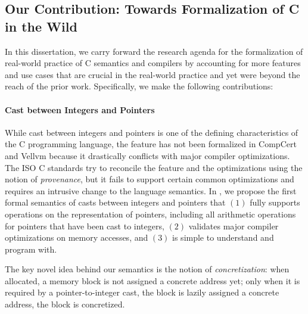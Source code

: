 



\subsection{Our Contribution: Towards Formalization of C in the Wild}

In this dissertation, we carry forward the research agenda for the formalization of real-world
practice of C semantics and compilers by accounting for more features and use cases that are crucial
in the real-world practice and yet were beyond the reach of the prior work.  Specifically, we make
the following contributions:



%
\paragraph{Cast between Integers and Pointers}

While cast between integers and pointers is one of the defining characteristics of the C programming
language, the feature has not been formalized in CompCert and Vellvm because it drastically
conflicts with major compiler optimizations.  The ISO C standards try to reconcile the feature and
the optimizations using the notion of \emph{provenance}, but it fails to support certain common
optimizations and requires an intrusive change to the language semantics.  In
, we propose the first formal semantics of casts between integers and pointers
that $(1)$ fully supports operations on the representation of pointers, including all arithmetic
operations for pointers that have been cast to integers, $(2)$ validates major compiler
optimizations on memory accesses, and $(3)$ is simple to understand and program with.

The key novel idea behind our semantics is the notion of \emph{concretization}: when allocated, a
memory block is not assigned a concrete address yet; only when it is required by a
pointer-to-integer cast, the block is lazily assigned a concrete address, \ie{} the block is
concretized.

